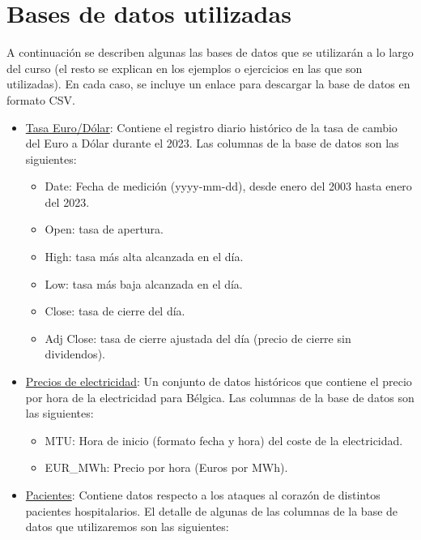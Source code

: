 \documentclass[
  11pt,
]{book}
\providecommand{\tightlist}{%
  \setlength{\itemsep}{0pt}\setlength{\parskip}{0pt}}
\theoremstyle{definition}
\theoremstyle{definition}
\theoremstyle{definition}
\theoremstyle{definition}
\theoremstyle{remark}
\begin{document}
\chapter*{Bases de datos utilizadas}\label{bases-de-datos-utilizadas}

A continuación se describen algunas las bases de datos que se utilizarán a lo largo del curso (el resto se explican en los ejemplos o ejercicios en las que son utilizadas). En cada caso, se incluye un enlace para descargar la base de datos en formato CSV.

\begin{itemize}
\item
  \protect{}\label{TasaEURUSD}\href{https://raw.githubusercontent.com/Dfranzani/Bases-de-datos-para-cursos/main/2023-1/Tasa\%2Beuro\%2Bdolar\%2Bhistorica2023.csv}{Tasa Euro/Dólar}: Contiene el registro diario histórico de la tasa de cambio del Euro a Dólar durante el 2023. Las columnas de la base de datos son las siguientes:

  \begin{itemize}
  \tightlist
  \item
    Date: Fecha de medición (yyyy-mm-dd), desde enero del 2003 hasta enero del 2023.
  \item
    Open: tasa de apertura.
  \item
    High: tasa más alta alcanzada en el día.
  \item
    Low: tasa más baja alcanzada en el día.
  \item
    Close: tasa de cierre del día.
  \item
    Adj Close: tasa de cierre ajustada del día (precio de cierre sin dividendos).
  \end{itemize}
\item
  \protect{}\label{PreciosElectricidad}\href{https://raw.githubusercontent.com/Dfranzani/Bases-de-datos-para-cursos/main/2024-1/Belgian\%20Electricity\%20Prices.csv}{Precios de electricidad}: Un conjunto de datos históricos que contiene el precio por hora de la electricidad para Bélgica. Las columnas de la base de datos son las siguientes:

  \begin{itemize}
  \tightlist
  \item
    MTU: Hora de inicio (formato fecha y hora) del coste de la electricidad.
  \item
    EUR\_MWh: Precio por hora (Euros por MWh).
  \end{itemize}
\item
  \protect{}\label{Pacientes}\href{https://raw.githubusercontent.com/Dfranzani/Bases-de-datos-para-cursos/main/2023-1/Heart+complete.csv}{Pacientes}: Contiene datos respecto a los ataques al corazón de distintos pacientes hospitalarios. El detalle de algunas de las columnas de la base de datos que utilizaremos son las siguientes:


\end{itemize}
\end{document}
